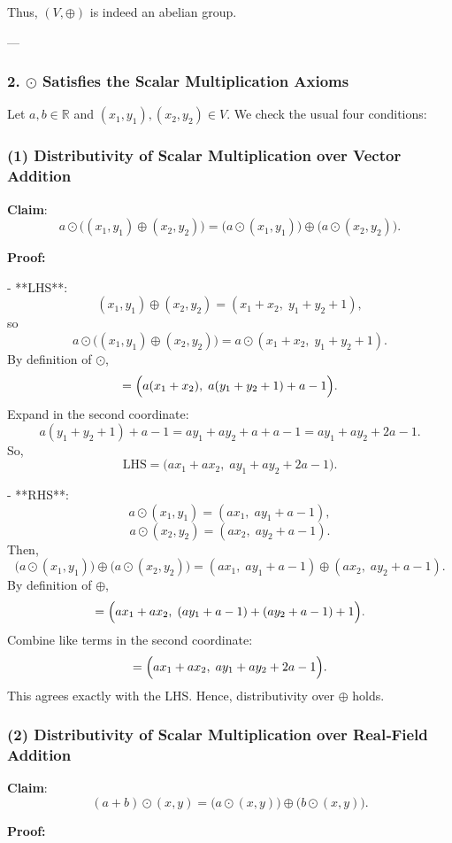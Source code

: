 \documentclass[12pt]{article}
\begin{document}
Thus, \((V, \oplus)\) is indeed an abelian group.

---

\subsubsection*{2. \(\odot\) Satisfies the Scalar Multiplication Axioms}

Let \(a,b \in \mathbb{R}\) and \((x_1,y_1), (x_2,y_2) \in V\). We check the usual four conditions:

\subsubsection*{(1) Distributivity of Scalar Multiplication over Vector Addition}

\textbf{Claim}:  
\[
a \odot \bigl((x_1,y_1)\oplus(x_2,y_2)\bigr) = \bigl(a\odot (x_1,y_1)\bigr) \oplus \bigl(a\odot (x_2,y_2)\bigr).
\]

\textbf{Proof:}

- **LHS**:
\[
(x_1,y_1)\oplus(x_2,y_2) = (x_1 + x_2,\; y_1 + y_2 + 1),
\]
so
\[
a \odot \bigl((x_1,y_1)\oplus (x_2,y_2)\bigr) = a \odot (x_1 + x_2,\; y_1 + y_2 + 1).
\]
By definition of \(\odot\),
\[
= \Bigl(a(x_1 + x_2),\; a(y_1 + y_2 + 1) + a - 1\Bigr).
\]
Expand in the second coordinate:
\[
a(y_1 + y_2 + 1) + a - 1 = a y_1 + a y_2 + a + a - 1 = a y_1 + a y_2 + 2a - 1.
\]
So,
\[
\text{LHS} = \bigl(a x_1 + a x_2,\; a y_1 + a y_2 + 2a - 1\bigr).
\]

- **RHS**:
\[
a \odot (x_1,y_1) = (a x_1,\; a y_1 + a - 1),
\]
\[
a \odot (x_2,y_2) = (a x_2,\; a y_2 + a - 1).
\]
Then,
\[
\bigl(a \odot (x_1,y_1)\bigr) \oplus \bigl(a \odot (x_2,y_2)\bigr) = (a x_1,\; a y_1 + a - 1) \oplus (a x_2,\; a y_2 + a - 1).
\]
By definition of \(\oplus\),
\[
= \Bigl(a x_1 + a x_2,\; (a y_1 + a - 1) + (a y_2 + a - 1) + 1\Bigr).
\]
Combine like terms in the second coordinate:
\[
= \Bigl(a x_1 + a x_2,\; a y_1 + a y_2 + 2a - 1\Bigr).
\]
This agrees exactly with the LHS. Hence, distributivity over \(\oplus\) holds.

\subsubsection*{(2) Distributivity of Scalar Multiplication over Real‐Field Addition}

\textbf{Claim}:  
\[
(a + b) \odot (x,y) = \bigl(a \odot (x,y)\bigr) \oplus \bigl(b \odot (x,y)\bigr).
\]

\textbf{Proof:}
\end{document}
